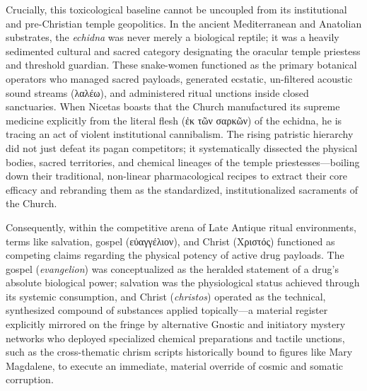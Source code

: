 \documentclass[11pt,twoside,a4paper]{article}
\begin{document}
Crucially, this toxicological baseline cannot be uncoupled from its institutional and pre-Christian temple geopolitics. In the ancient Mediterranean and Anatolian substrates, the \textit{echidna} was never merely a biological reptile; it was a heavily sedimented cultural and sacred category designating the oracular temple priestess and threshold guardian. These snake-women functioned as the primary botanical operators who managed sacred payloads, generated ecstatic, un-filtered acoustic sound streams (\textgreek{λαλέω}), and administered ritual unctions inside closed sanctuaries. When Nicetas boasts that the Church manufactured its supreme medicine explicitly from the literal flesh (\textgreek{ἐκ τῶν σαρκῶν}) of the echidna, he is tracing an act of violent institutional cannibalism. The rising patristic hierarchy did not just defeat its pagan competitors; it systematically dissected the physical bodies, sacred territories, and chemical lineages of the temple priestesses—boiling down their traditional, non-linear pharmacological recipes to extract their core efficacy and rebranding them as the standardized, institutionalized sacraments of the Church.

Consequently, within the competitive arena of Late Antique ritual environments, terms like salvation, gospel (\textgreek{εὐαγγέλιον}), and Christ (\textgreek{Χριστός}) functioned as competing claims regarding the physical potency of active drug payloads. The gospel (\textit{evangelion}) was conceptualized as the heralded statement of a drug's absolute biological power; salvation was the physiological status achieved through its systemic consumption, and Christ (\textit{christos}) operated as the technical, synthesized compound of substances applied topically—a material register explicitly mirrored on the fringe by alternative Gnostic and initiatory mystery networks who deployed specialized chemical preparations and tactile unctions, such as the cross-thematic chrism scripts historically bound to figures like Mary Magdalene, to execute an immediate, material override of cosmic and somatic corruption.
\end{document}
